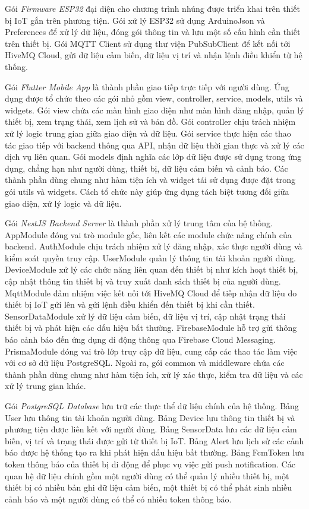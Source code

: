 \documentclass[../DoAn.tex]{subfiles}
\begin{document}
Gói \textit{Firmware ESP32} đại diện cho chương trình nhúng được triển khai trên thiết bị IoT gắn trên phương tiện. Gói xử lý ESP32 sử dụng ArduinoJson và Preferences để xử lý dữ liệu, đóng gói thông tin và lưu một số cấu hình cần thiết trên thiết bị. Gói MQTT Client sử dụng thư viện PubSubClient để kết nối tới HiveMQ Cloud, gửi dữ liệu cảm biến, dữ liệu vị trí và nhận lệnh điều khiển từ hệ thống. 

Gói \textit{Flutter Mobile App} là thành phần giao tiếp trực tiếp với người dùng. Ứng dụng được tổ chức theo các gói nhỏ gồm view, controller, service, models, utils và widgets. Gói view chứa các màn hình giao diện như màn hình đăng nhập, quản lý thiết bị, xem trạng thái, xem lịch sử và bản đồ. Gói controller chịu trách nhiệm xử lý logic trung gian giữa giao diện và dữ liệu. Gói service thực hiện các thao tác giao tiếp với backend thông qua API, nhận dữ liệu thời gian thực và xử lý các dịch vụ liên quan. Gói models định nghĩa các lớp dữ liệu được sử dụng trong ứng dụng, chẳng hạn như người dùng, thiết bị, dữ liệu cảm biến và cảnh báo. Các thành phần dùng chung như hàm tiện ích và widget tái sử dụng được đặt trong gói utils và widgets. Cách tổ chức này giúp ứng dụng tách biệt tương đối giữa giao diện, xử lý logic và dữ liệu.

Gói \textit{NestJS Backend Server} là thành phần xử lý trung tâm của hệ thống. AppModule đóng vai trò module gốc, liên kết các module chức năng chính của backend. AuthModule chịu trách nhiệm xử lý đăng nhập, xác thực người dùng và kiểm soát quyền truy cập. UserModule quản lý thông tin tài khoản người dùng. DeviceModule xử lý các chức năng liên quan đến thiết bị như kích hoạt thiết bị, cập nhật thông tin thiết bị và truy xuất danh sách thiết bị của người dùng. MqttModule đảm nhiệm việc kết nối tới HiveMQ Cloud để tiếp nhận dữ liệu do thiết bị IoT gửi lên và gửi lệnh điều khiển đến thiết bị khi cần thiết. SensorDataModule xử lý dữ liệu cảm biến, dữ liệu vị trí, cập nhật trạng thái thiết bị và phát hiện các dấu hiệu bất thường. FirebaseModule hỗ trợ gửi thông báo cảnh báo đến ứng dụng di động thông qua Firebase Cloud Messaging. PrismaModule đóng vai trò lớp truy cập dữ liệu, cung cấp các thao tác làm việc với cơ sở dữ liệu PostgreSQL. Ngoài ra, gói common và middleware chứa các thành phần dùng chung như hàm tiện ích, xử lý xác thực, kiểm tra dữ liệu và các xử lý trung gian khác.

Gói \textit{PostgreSQL Database} lưu trữ các thực thể dữ liệu chính của hệ thống. Bảng User lưu thông tin tài khoản người dùng. Bảng Device lưu thông tin thiết bị và phương tiện được liên kết với người dùng. Bảng SensorData lưu các dữ liệu cảm biến, vị trí và trạng thái được gửi từ thiết bị IoT. Bảng Alert lưu lịch sử các cảnh báo được hệ thống tạo ra khi phát hiện dấu hiệu bất thường. Bảng FcmToken lưu token thông báo của thiết bị di động để phục vụ việc gửi push notification. Các quan hệ dữ liệu chính gồm một người dùng có thể quản lý nhiều thiết bị, một thiết bị có nhiều bản ghi dữ liệu cảm biến, một thiết bị có thể phát sinh nhiều cảnh báo và một người dùng có thể có nhiều token thông báo.
\end{document}
